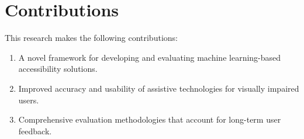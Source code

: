 \documentclass{article}
\begin{document}
\section{Contributions}
This research makes the following contributions:
\begin{enumerate}
    \item A novel framework for developing and evaluating machine learning-based accessibility solutions.
    \item Improved accuracy and usability of assistive technologies for visually impaired users.
    \item Comprehensive evaluation methodologies that account for long-term user feedback.
\end{enumerate}



\end{document}
